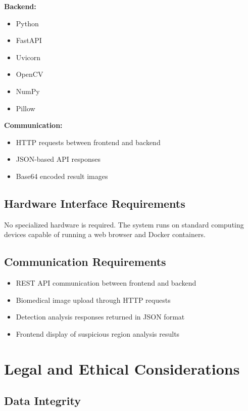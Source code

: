 \documentclass[12pt]{article}
\begin{document}
\textbf{Backend:}

\begin{itemize}
    \item Python
    \item FastAPI
    \item Uvicorn
    \item OpenCV
    \item NumPy
    \item Pillow
\end{itemize}

\textbf{Communication:}

\begin{itemize}
    \item HTTP requests between frontend and backend
    \item JSON-based API responses
    \item Base64 encoded result images
\end{itemize}

\subsection{Hardware Interface Requirements}

No specialized hardware is required. The system runs on standard computing devices capable
of running a web browser and Docker containers.

\subsection{Communication Requirements}

\begin{itemize}
    \item REST API communication between frontend and backend
    \item Biomedical image upload through HTTP requests
    \item Detection analysis responses returned in JSON format
    \item Frontend display of suspicious region analysis results
\end{itemize}

\section{Legal and Ethical Considerations}

\subsection{Data Integrity}
\end{document}
